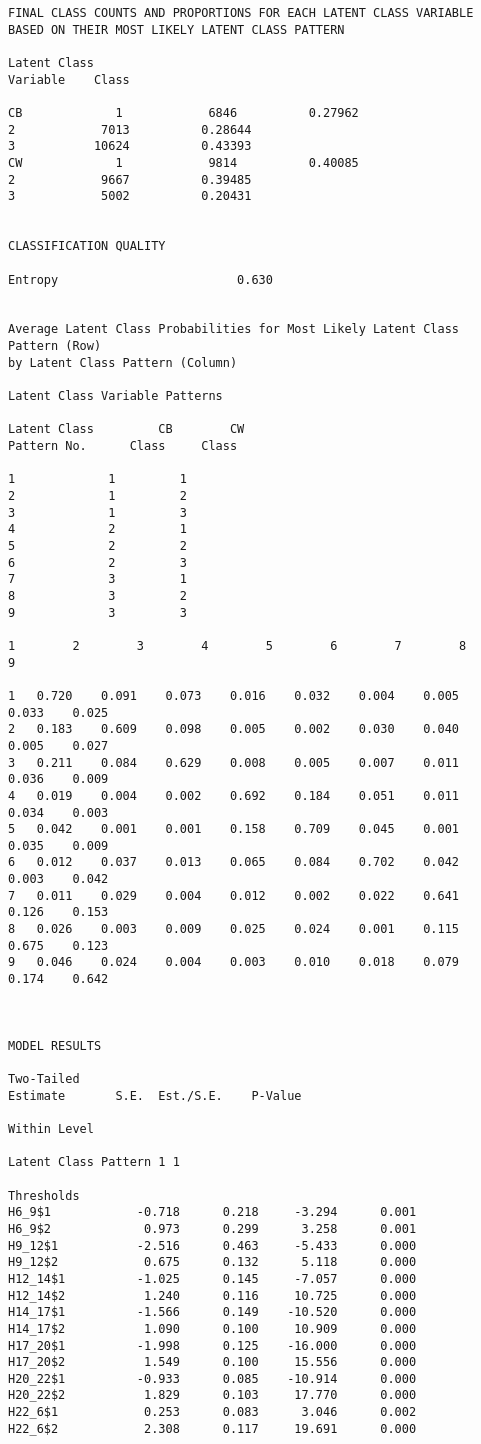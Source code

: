 \begin{verbatim}
FINAL CLASS COUNTS AND PROPORTIONS FOR EACH LATENT CLASS VARIABLE
BASED ON THEIR MOST LIKELY LATENT CLASS PATTERN

Latent Class
Variable    Class

CB             1            6846          0.27962
2            7013          0.28644
3           10624          0.43393
CW             1            9814          0.40085
2            9667          0.39485
3            5002          0.20431


CLASSIFICATION QUALITY

Entropy                         0.630


Average Latent Class Probabilities for Most Likely Latent Class Pattern (Row)
by Latent Class Pattern (Column)

Latent Class Variable Patterns

Latent Class         CB        CW
Pattern No.      Class     Class

1             1         1
2             1         2
3             1         3
4             2         1
5             2         2
6             2         3
7             3         1
8             3         2
9             3         3

1        2        3        4        5        6        7        8        9

1   0.720    0.091    0.073    0.016    0.032    0.004    0.005    0.033    0.025
2   0.183    0.609    0.098    0.005    0.002    0.030    0.040    0.005    0.027
3   0.211    0.084    0.629    0.008    0.005    0.007    0.011    0.036    0.009
4   0.019    0.004    0.002    0.692    0.184    0.051    0.011    0.034    0.003
5   0.042    0.001    0.001    0.158    0.709    0.045    0.001    0.035    0.009
6   0.012    0.037    0.013    0.065    0.084    0.702    0.042    0.003    0.042
7   0.011    0.029    0.004    0.012    0.002    0.022    0.641    0.126    0.153
8   0.026    0.003    0.009    0.025    0.024    0.001    0.115    0.675    0.123
9   0.046    0.024    0.004    0.003    0.010    0.018    0.079    0.174    0.642



MODEL RESULTS

Two-Tailed
Estimate       S.E.  Est./S.E.    P-Value

Within Level

Latent Class Pattern 1 1

Thresholds
H6_9$1            -0.718      0.218     -3.294      0.001
H6_9$2             0.973      0.299      3.258      0.001
H9_12$1           -2.516      0.463     -5.433      0.000
H9_12$2            0.675      0.132      5.118      0.000
H12_14$1          -1.025      0.145     -7.057      0.000
H12_14$2           1.240      0.116     10.725      0.000
H14_17$1          -1.566      0.149    -10.520      0.000
H14_17$2           1.090      0.100     10.909      0.000
H17_20$1          -1.998      0.125    -16.000      0.000
H17_20$2           1.549      0.100     15.556      0.000
H20_22$1          -0.933      0.085    -10.914      0.000
H20_22$2           1.829      0.103     17.770      0.000
H22_6$1            0.253      0.083      3.046      0.002
H22_6$2            2.308      0.117     19.691      0.000


\end{verbatim}
